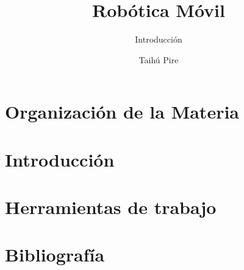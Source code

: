 \documentclass[aspectratio=169,compress]{beamer}
\subtitle{Introducción}
\title{Robótica Móvil}
\author{Taihú Pire}
\institute{Laboratorio de Robótica}
\date{}
\begin{document}
\frame{\titlepage}

\section{Organización de la Materia}


\section{Introducción}


\section{Herramientas de trabajo}


\section{Bibliografía}

\end{document}
